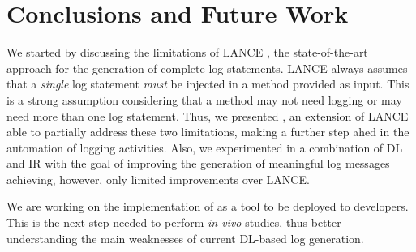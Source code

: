 \section{Conclusions and Future Work} \label{sec:conclusions}

We started by discussing the limitations of LANCE \cite{mastropaolo2022using}, the state-of-the-art approach for the generation of complete log statements. LANCE always assumes that a \emph{single} log statement \emph{must} be injected in a method provided as input. This is a strong assumption considering that a method may not need logging or may need more than one log statement. Thus, we presented \approach, an extension of LANCE able to partially address these two limitations, making a further step ahed in the automation of logging activities. Also, we experimented in \approach a combination of DL and IR with the goal of improving the generation of meaningful log messages achieving, however, only limited improvements over LANCE. 

We are working on the implementation of \approach as a tool to be deployed to developers. This is the next step needed to perform \emph{in vivo} studies, thus better understanding the main weaknesses of current DL-based log generation. 